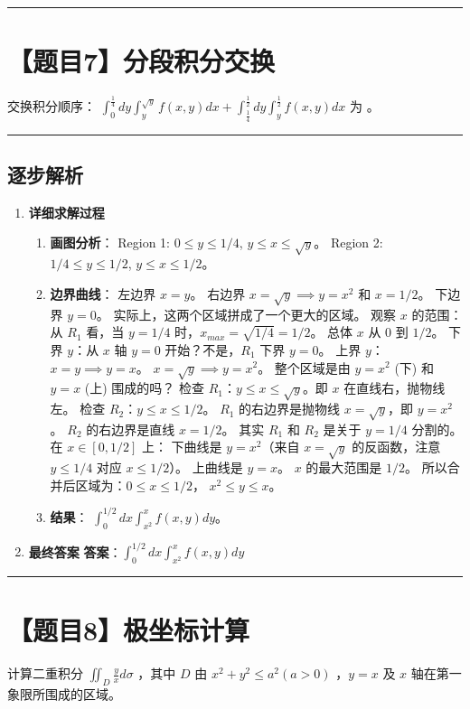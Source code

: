 \documentclass[UTF8]{ctexart}
\newenvironment{redenv}{\color{red}}{}
\newenvironment{detailedanalysis}{%
    \color{red}
    \begin{enumerate}[label=\textbf{第\arabic*步：}, leftmargin=*, align=left, itemsep=1.5ex]
}{%
    \end{enumerate}
}
\newcommand{\problemrule}{\noindent\rule{\textwidth}{1.5pt}\vspace{-0.8em}}
\newcommand{\analysisrule}{\noindent\rule{\textwidth}{0.8pt}\vspace{-0.8em}}
\newcommand{\blank}[1]{\underline{\hspace{#1}}}
\begin{document}
\problemrule
\section*{【题目7】分段积分交换}
交换积分顺序： $ \int_{0}^{\frac{1}{4}}dy\int_{y}^{\sqrt{y}}f(x,y)dx+\int_{\frac{1}{4}}^{\frac{1}{2}}dy\int_{y}^{\frac{1}{2}}f(x,y)dx $ 为 \blank{2cm}。

\begin{redenv}
\analysisrule
\subsection*{逐步解析}

\begin{detailedanalysis}
\item \textbf{详细求解过程}
\begin{enumerate}[label=(\arabic*)]
\item \textbf{画图分析}：
Region 1: $0 \le y \le 1/4$, $y \le x \le \sqrt{y}$。
Region 2: $1/4 \le y \le 1/2$, $y \le x \le 1/2$。
\item \textbf{边界曲线}：
左边界 $x=y$。
右边界 $x=\sqrt{y} \implies y=x^2$ 和 $x=1/2$。
下边界 $y=0$。
实际上，这两个区域拼成了一个更大的区域。
观察 $x$ 的范围：
从 $R_1$ 看，当 $y=1/4$ 时，$x_{max} = \sqrt{1/4} = 1/2$。
总体 $x$ 从 $0$ 到 $1/2$。
下界 $y$：从 $x$ 轴 $y=0$ 开始？不是，$R_1$ 下界 $y=0$。
上界 $y$：
$x=y \implies y=x$。
$x=\sqrt{y} \implies y=x^2$。
整个区域是由 $y=x^2$ (下) 和 $y=x$ (上) 围成的吗？
检查 $R_1$：$y \le x \le \sqrt{y}$。即 $x$ 在直线右，抛物线左。
检查 $R_2$：$y \le x \le 1/2$。
$R_1$ 的右边界是抛物线 $x=\sqrt{y}$，即 $y=x^2$。
$R_2$ 的右边界是直线 $x=1/2$。
其实 $R_1$ 和 $R_2$ 是关于 $y=1/4$ 分割的。
在 $x \in [0, 1/2]$ 上：
下曲线是 $y=x^2$（来自 $x=\sqrt{y}$ 的反函数，注意 $y \le 1/4$ 对应 $x \le 1/2$）。
上曲线是 $y=x$。
$x$ 的最大范围是 $1/2$。
所以合并后区域为：$0 \le x \le 1/2$， $x^2 \le y \le x$。
\item \textbf{结果}：
$\int_0^{1/2} dx \int_{x^2}^x f(x,y) dy$。
\end{enumerate}

\item \textbf{最终答案}
\textbf{答案}：$ \int_0^{1/2} dx \int_{x^2}^x f(x,y) dy $
\end{detailedanalysis}
\end{redenv}

\problemrule
\section*{【题目8】极坐标计算}
计算二重积分 $ \iint_{D} \frac{y}{x} d\sigma $ ，其中 $D$ 由 $ x^{2} + y^{2} \leq a^{2} (a > 0) $ ，$y = x$ 及 $x$ 轴在第一象限所围成的区域。
\end{document}
